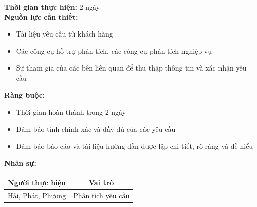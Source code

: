 {\begin{minipage}{\textwidth}
\begin{itemize}
    \end{itemize}
    \noindent \textbf{Thời gian thực hiện:} 2 ngày \\
    \noindent \textbf{Nguồn lực cần thiết:}
    \begin{itemize}
        \item Tài liệu yêu cầu từ khách hàng
        \item Các công cụ hỗ trợ phân tích, các công cụ phân tích nghiệp vụ
        \item Sự tham gia của các bên liên quan để thu thập thông tin và xác nhận yêu cầu
    \end{itemize}
    \noindent \textbf{Ràng buộc:}
    \begin{itemize}
        \item Thời gian hoàn thành trong 2 ngày
        \item Đảm bảo tính chính xác và đầy đủ của các yêu cầu
        \item Đảm bảo báo cáo và tài liệu hướng dẫn được lập chi tiết, rõ ràng và dễ hiểu
    \end{itemize}
    \noindent \textbf{Nhân sự:}
    \begin{longtable}{|c|c|}
    \hline
    \textbf{Người thực hiện} & \textbf{Vai trò} \\
    \hline
    Hải, Phát, Phương & Phân tích yêu cầu \\
    \hline
    \end{longtable}
    \end{minipage}
}
\newpage %
